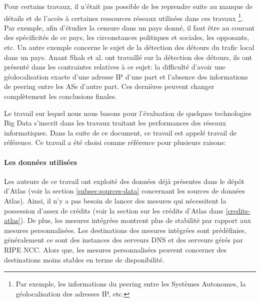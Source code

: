
Pour certains travaux, il n'était pas possible  de les reprendre suite au manque de détails et de l'accès à  certaines ressources réseaux utilisées dans ces travaux \footnote{Par exemple, les informations du peering entre les Systèmes Autonomes, la géolocalisation des adresses IP, etc.}. Par exemple, afin d'étudier la censure dans un pays donné, il faut être au courant des spécificités de ce pays, les circonstances politiques et sociales, les opposants,  etc.  Un autre exemple concerne le sujet de la détection des détours du trafic local dans un pays.  Anant Shah  et al. ont travaillé sur la détection des détours, ils ont présenté dans  \cite{anant-shah} les contraintes relatives à ce sujet: la difficulté d'avoir une géolocalisation exacte d'une adresse IP d'une part et l'absence des informations de peering entre les ASs d'autre part. Ces dernières peuvent changer complètement les conclusions finales. 

Le travail sur lequel nous nous basons \cite{DBLP:journals/corr/FontugneAPB16} pour l'évaluation de quelques technologies Big Data s'inscrit dans les travaux traitant les performances des réseaux informatiques. Dans la suite de ce document, ce travail est appelé  travail de référence.  Ce travail a été choisi comme référence pour plusieurs raisons:



\paragraph{Les données utilisées}  Les auteurs de ce travail ont exploité des données déjà présentes dans le dépôt d'Atlas (voir la section \ref{subsec:sources-data} concernant les sources de données Atlas). Ainsi, il n'y a pas besoin de lancer des mesures qui nécessitent la possession d'assez de crédits (voir la section sur les crédits d'Atlas dans \ref{credits-atlas}). De plus, les mesures intégrées montrent plus de stabilité par rapport aux mesures personnalisées. Les destinations des mesures intégrées sont prédéfinies, généralement ce sont des instances des serveurs DNS et des serveurs gérés par  RIPE NCC. Alors que, les mesures personnalisées peuvent concerner des destinations moins stables en terme de disponibilité.

